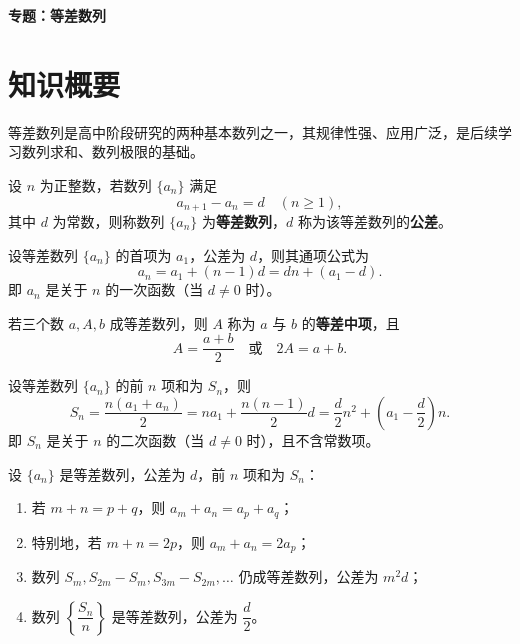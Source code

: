 \documentclass[11pt]{ctexrep}
\begin{document}
\begin{center}
    {\LARGE\bfseries 专题：等差数列}
\end{center}

\section*{知识概要}

等差数列是高中阶段研究的两种基本数列之一，其规律性强、应用广泛，是后续学习数列求和、数列极限的基础。

\begin{definition}[等差数列]
    设 $n$ 为正整数，若数列 $\{a_n\}$ 满足
    \[
        a_{n+1} - a_n = d \quad (n \geq 1),
    \]
    其中 $d$ 为常数，则称数列 $\{a_n\}$ 为\textbf{等差数列}，$d$ 称为该等差数列的\textbf{公差}。
\end{definition}

\begin{property}[通项公式]
    设等差数列 $\{a_n\}$ 的首项为 $a_1$，公差为 $d$，则其通项公式为
    \[
        a_n = a_1 + (n-1)d = dn + (a_1 - d).
    \]
    即 $a_n$ 是关于 $n$ 的一次函数（当 $d \neq 0$ 时）。
\end{property}

\begin{property}[等差中项]
    若三个数 $a, A, b$ 成等差数列，则 $A$ 称为 $a$ 与 $b$ 的\textbf{等差中项}，且
    \[
        A = \frac{a+b}{2} \quad \text{或} \quad 2A = a + b.
    \]
\end{property}

\begin{property}[前 $n$ 项和公式]
    设等差数列 $\{a_n\}$ 的前 $n$ 项和为 $S_n$，则
    \[
        S_n = \frac{n(a_1 + a_n)}{2} = na_1 + \frac{n(n-1)}{2}d = \frac{d}{2}n^2 + \left(a_1 - \frac{d}{2}\right)n.
    \]
    即 $S_n$ 是关于 $n$ 的二次函数（当 $d \neq 0$ 时），且不含常数项。
\end{property}

\begin{property}[重要性质]
    设 $\{a_n\}$ 是等差数列，公差为 $d$，前 $n$ 项和为 $S_n$：
    \begin{enumerate}
        \item 若 $m + n = p + q$，则 $a_m + a_n = a_p + a_q$；
        \item 特别地，若 $m + n = 2p$，则 $a_m + a_n = 2a_p$；
        \item 数列 $S_m, S_{2m} - S_m, S_{3m} - S_{2m}, \ldots$ 仍成等差数列，公差为 $m^2d$；
        \item 数列 $\left\{\dfrac{S_n}{n}\right\}$ 是等差数列，公差为 $\dfrac{d}{2}$。
    \end{enumerate}
\end{property}
\end{document}
